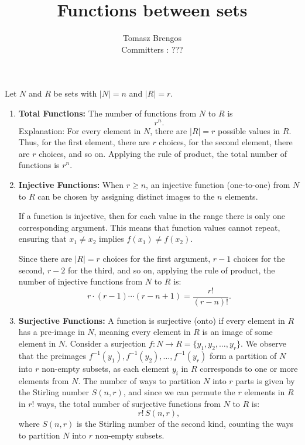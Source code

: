 \documentclass{article}
\title{Functions between sets}
\author{Tomasz Brengos \\  
Committers : ???}
\date{}
\begin{document}
\maketitle
Let $N$ and $R$ be sets with $|N| = n$ and $|R| = r$.

\begin{enumerate}[label=(\roman*)]
    \item \textbf{Total Functions:}  
    The number of functions from \( N \) to \( R \) is  
    \[
    r^n.
    \]  
    Explanation: For every element in \( N \), there are \( |R| = r \) possible values in \( R \). Thus, for the first element, there are \( r \) choices, for the second element, there are \( r \) choices, and so on.  
    Applying the rule of product, the total number of functions is \( r^n \).

    \item \textbf{Injective Functions:}  
    When \( r \geq n \), an injective function (one-to-one) from \( N \) to \( R \) can be chosen by assigning distinct images to the \( n \) elements.  

    If a function is injective, then for each value in the range there is only one corresponding argument. This means that function values cannot repeat, ensuring that \( x_1 \neq x_2 \) implies \( f(x_1) \neq f(x_2) \).  

    Since there are \( |R| = r \) choices for the first argument, \( r-1 \) choices for the second, \( r-2 \) for the third, and so on, applying the rule of product, the number of injective functions from \( N \) to \( R \) is:  
    \[
    r \cdot (r-1) \cdots (r-n+1) = \frac{r!}{(r-n)!}.
    \]
    \item \textbf{Surjective Functions:}  
    A function is surjective (onto) if every element in \( R \) has a pre-image in \( N \), meaning every element in \( R \) is an image of some element in \( N \).  
    Consider a surjection \( f: N \to R = \{y_1, y_2, \dots, y_r\} \). We observe that the preimages \( f^{-1}(y_1), f^{-1}(y_2), \dots, f^{-1}(y_r) \) form a partition of \( N \) into \( r \) non-empty subsets, as each element \( y_i \) in \( R \) corresponds to one or more elements from \( N \).  
    The number of ways to partition \( N \) into \( r \) parts is given by the Stirling number \( S(n, r) \), and since we can permute the \( r \) elements in \( R \) in \( r! \) ways, the total number of surjective functions from \( N \) to \( R \) is:  
    \[
    r! \, S(n, r),
    \]
    where \( S(n, r) \) is the Stirling number of the second kind, counting the ways to partition \( N \) into \( r \) non-empty subsets.

\end{enumerate}
\end{document}
